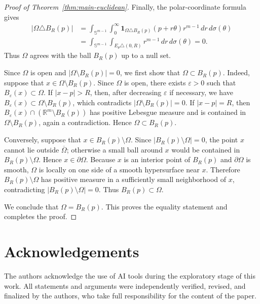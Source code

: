 \documentclass[11pt,letterpaper,reqno]{amsart}
\theoremstyle{definition}
\newcommand{\Sph}{\mathbb S}
\begin{document}
\begin{proof}[Proof of Theorem~\ref{thm:main-euclidean}]
Finally, the polar-coordinate formula gives
\[
\begin{aligned}
        |\Omega\triangle B_R(p)|
        &=
        \int_{\Sph^{m-1}}
        \int_0^\infty
        \mathbf 1_{\Omega\triangle B_R(p)}(p+r\theta)
        r^{m-1}\,dr\,d\sigma(\theta) \\
        &=
        \int_{\Sph^{m-1}}
        \int_{E_\theta\triangle(0,R)}
        r^{m-1}\,dr\,d\sigma(\theta)
        =0.
\end{aligned}
\]
Thus \(\Omega\) agrees with the ball \(B_R(p)\) up to a null set.


Since \(\Omega\) is open and \(|\Omega\setminus B_R(p)|=0\), we first show
that \(\Omega\subset B_R(p)\). Indeed, suppose that
\(x\in\Omega\setminus B_R(p)\). Since \(\Omega\) is open, there exists
\(\varepsilon>0\) such that \(B_\varepsilon(x)\subset\Omega\). If
\(|x-p|>R\), then, after decreasing \(\varepsilon\) if necessary, we have
\(B_\varepsilon(x)\subset \Omega\setminus B_R(p)\), which contradicts
\(|\Omega\setminus B_R(p)|=0\). If \(|x-p|=R\), then
\(B_\varepsilon(x)\cap (\mathbb R^m\setminus B_R(p))\) has positive
Lebesgue measure and is contained in \(\Omega\setminus B_R(p)\), again a
contradiction. Hence \(\Omega\subset B_R(p)\).



Conversely, suppose that \(x\in B_R(p)\setminus\Omega\). Since
\(|B_R(p)\setminus\Omega|=0\), the point \(x\) cannot lie outside
\(\overline\Omega\); otherwise a small ball around \(x\) would be
contained in \(B_R(p)\setminus\Omega\). Hence \(x\in\partial\Omega\).
Because \(x\) is an interior point of \(B_R(p)\) and \(\partial\Omega\) is
smooth, \(\Omega\) is locally on one side of a smooth hypersurface near
\(x\). Therefore \(B_R(p)\setminus\Omega\) has positive measure in a
sufficiently small neighborhood of \(x\), contradicting
\(|B_R(p)\setminus\Omega|=0\). Thus \(B_R(p)\subset\Omega\).

We conclude that \(\Omega=B_R(p)\). This proves the equality statement and completes the proof.
\end{proof}






\section*{Acknowledgements}

The authors acknowledge the use of AI tools during the exploratory stage
of this work. All statements and arguments were independently verified,
revised, and finalized by the authors, who take full responsibility for
the content of the paper.
\end{document}
